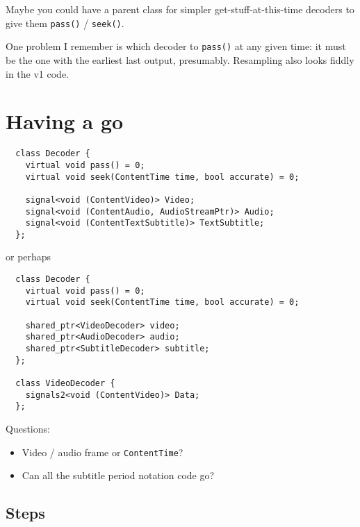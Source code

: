 \documentclass{article}
\begin{document}
Maybe you could have a parent class for simpler get-stuff-at-this-time
decoders to give them \texttt{pass()} / \texttt{seek()}.

One problem I remember is which decoder to \texttt{pass()} at any given time:
it must be the one with the earliest last output, presumably.
Resampling also looks fiddly in the v1 code.


\section{Having a go}

\begin{lstlisting}
  class Decoder {
    virtual void pass() = 0;
    virtual void seek(ContentTime time, bool accurate) = 0;

    signal<void (ContentVideo)> Video;
    signal<void (ContentAudio, AudioStreamPtr)> Audio;
    signal<void (ContentTextSubtitle)> TextSubtitle;
  };
\end{lstlisting}

or perhaps

\begin{lstlisting}
  class Decoder {
    virtual void pass() = 0;
    virtual void seek(ContentTime time, bool accurate) = 0;

    shared_ptr<VideoDecoder> video;
    shared_ptr<AudioDecoder> audio;
    shared_ptr<SubtitleDecoder> subtitle;
  };

  class VideoDecoder {
    signals2<void (ContentVideo)> Data;
  };
\end{lstlisting}

Questions:
\begin{itemize}
\item Video / audio frame or \texttt{ContentTime}?
\item Can all the subtitle period notation code go?
\end{itemize}

\subsection{Steps}
\end{document}
